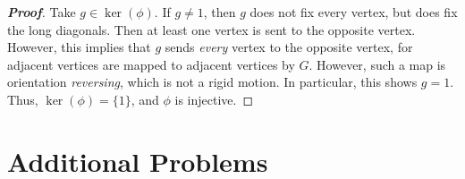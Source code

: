 \documentclass[12pt,leqno]{book}
\theoremstyle{definition}
\newenvironment{Proof}{\begin{proof}[\textnormal{\textbf{Proof}}]}{\end{proof}}
\begin{document}
\begin{description}
\begin{description}
\begin{Proof}
Take $g\in\ker(\phi)$. If $g\not=1$, then $g$ does not fix every vertex, but does fix the long diagonals. Then at least one vertex is sent to the opposite vertex. However, this implies that $g$ sends \textit{every} vertex to the opposite vertex, for adjacent vertices are mapped to adjacent vertices by $G$. However, such a map is orientation \textit{reversing}, which is not a rigid motion. In particular, this shows $g=1$. Thus, $\ker(\phi)=\{1\}$, and $\phi$ is injective.
\end{Proof}

\end{description}
\end{description}
\section*{Additional Problems}
\end{document}
